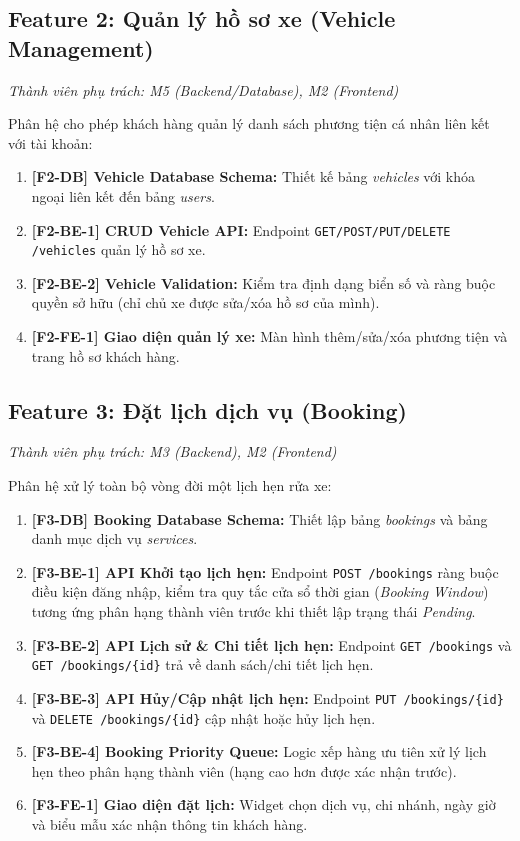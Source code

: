 \subsection{Feature 2: Quản lý hồ sơ xe (Vehicle Management)}
\textit{Thành viên phụ trách: M5 (Backend/Database), M2 (Frontend)}

Phân hệ cho phép khách hàng quản lý danh sách phương tiện cá nhân liên kết với tài khoản:
\begin{enumerate}
    \item \textbf{[F2-DB] Vehicle Database Schema:} Thiết kế bảng \textit{vehicles} với khóa ngoại liên kết đến bảng \textit{users}.
    \item \textbf{[F2-BE-1] CRUD Vehicle API:} Endpoint \texttt{GET/POST/PUT/DELETE /vehicles} quản lý hồ sơ xe.
    \item \textbf{[F2-BE-2] Vehicle Validation:} Kiểm tra định dạng biển số và ràng buộc quyền sở hữu (chỉ chủ xe được sửa/xóa hồ sơ của mình).
    \item \textbf{[F2-FE-1] Giao diện quản lý xe:} Màn hình thêm/sửa/xóa phương tiện và trang hồ sơ khách hàng.
\end{enumerate}

\subsection{Feature 3: Đặt lịch dịch vụ (Booking)}
\textit{Thành viên phụ trách: M3 (Backend), M2 (Frontend)}

Phân hệ xử lý toàn bộ vòng đời một lịch hẹn rửa xe:
\begin{enumerate}
    \item \textbf{[F3-DB] Booking Database Schema:} Thiết lập bảng \textit{bookings} và bảng danh mục dịch vụ \textit{services}.
    \item \textbf{[F3-BE-1] API Khởi tạo lịch hẹn:} Endpoint \texttt{POST /bookings} ràng buộc điều kiện đăng nhập, kiểm tra quy tắc cửa sổ thời gian (\textit{Booking Window}) tương ứng phân hạng thành viên trước khi thiết lập trạng thái \textit{Pending}.
    \item \textbf{[F3-BE-2] API Lịch sử \& Chi tiết lịch hẹn:} Endpoint \texttt{GET /bookings} và \texttt{GET /bookings/\{id\}} trả về danh sách/chi tiết lịch hẹn.
    \item \textbf{[F3-BE-3] API Hủy/Cập nhật lịch hẹn:} Endpoint \texttt{PUT /bookings/\{id\}} và \texttt{DELETE /bookings/\{id\}} cập nhật hoặc hủy lịch hẹn.
    \item \textbf{[F3-BE-4] Booking Priority Queue:} Logic xếp hàng ưu tiên xử lý lịch hẹn theo phân hạng thành viên (hạng cao hơn được xác nhận trước).
    \item \textbf{[F3-FE-1] Giao diện đặt lịch:} Widget chọn dịch vụ, chi nhánh, ngày giờ và biểu mẫu xác nhận thông tin khách hàng.
\end{enumerate}

